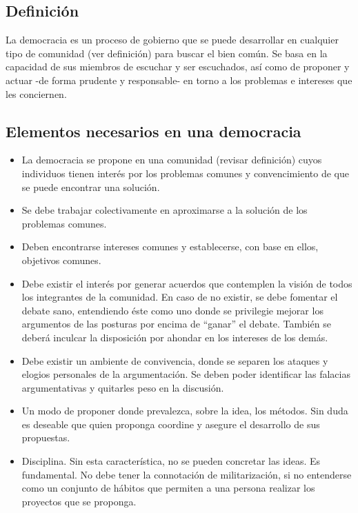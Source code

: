 \documentclass[10pt,letterpaper,oneside]{book}
\begin{document}
		\subsection*{Definición}
La democracia es un proceso de gobierno que se puede desarrollar en cualquier tipo de comunidad (ver definición) para buscar el bien común. Se basa en la capacidad de sus miembros de escuchar y ser escuchados, así como de proponer y actuar -de forma prudente y responsable- en torno a los problemas e intereses que les conciernen.
	\vspace{-0.3cm}
		\subsection*{Elementos necesarios en una democracia}	
			\begin{itemize}
			\item La democracia se propone en una comunidad (revisar definición) cuyos individuos tienen interés por los problemas comunes y convencimiento de que se puede encontrar una solución.
			\item Se debe trabajar colectivamente en aproximarse a la solución de los problemas comunes.
			\item Deben encontrarse intereses comunes y establecerse, con base en ellos, objetivos comunes.
			\item Debe existir el interés por generar acuerdos que contemplen la visión de todos los integrantes de la comunidad. En caso de no existir, se debe fomentar el debate sano, entendiendo éste como uno donde se privilegie mejorar los argumentos de las posturas por encima de ``ganar'' el debate. También se deberá inculcar la disposición por ahondar en los intereses de los demás.
			\item Debe existir un ambiente de convivencia, donde se separen los ataques y elogios personales de la argumentación. Se deben poder identificar las falacias argumentativas y quitarles peso en la discusión.
			\item Un modo de proponer donde prevalezca, sobre la idea, los métodos. Sin duda es deseable que quien proponga coordine y asegure el desarrollo de sus propuestas.
			\item Disciplina. Sin esta característica, no se pueden concretar las ideas. Es fundamental. No debe tener la connotación de militarización, si no entenderse como un conjunto de hábitos que permiten a una persona realizar los proyectos que se proponga.
			\end{itemize}
	\vspace{-0.3cm}	
\end{document}
